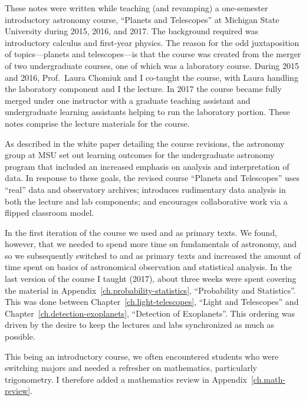 
These notes were written while teaching (and revamping) a one-semester introductory astronomy course, ``Planets and Telescopes'' at Michigan State University during 2015, 2016, and 2017. The background required was introductory calculus and first-year physics. The reason for the odd juxtaposition of topics---planets and telescopes---is that the course was created from the merger of two undergraduate courses, one of which was a laboratory course. During 2015 and 2016, Prof.\ Laura Chomiuk and I co-taught the course, with Laura handling the laboratory component and I the lecture. In 2017 the course became fully merged under one instructor with a graduate teaching assistant and undergraduate learning assistants helping to run the laboratory portion. These notes comprise the lecture materials for the course.

As described in the white paper detailing the course revisions\cite{BrownDevelopment-of-}, the astronomy group at MSU set out learning outcomes for the undergraduate astronomy program that included an increased emphasis on analysis and interpretation of data.
In response to these goals, the revised course ``Planets and Telescopes'' uses ``real'' data and observatory archives; introduces rudimentary data analysis in both the lecture and lab components; and encourages collaborative work via a flipped classroom model.

In the first iteration of the course we used  and  as primary texts. We found, however, that we needed to spend more time on fundamentals of astronomy, and so we subsequently switched to  and  as primary texts and increased the amount of time spent on basics of astronomical observation and statistical analysis. In the last version of the course I taught (2017), about three weeks were spent covering the material in Appendix~\ref{ch.probability-statistics}, ``Probability and Statistics''. This was done between Chapter~\ref{ch.light-telescopes}, ``Light and Telescopes'' and Chapter~\ref{ch.detection-exoplanets}, ``Detection of Exoplanets''.  This ordering was driven by the desire to keep the lectures and labs synchronized as much as possible.

This being an introductory course, we often encountered students who were switching majors and needed a refresher on mathematics, particularly trigonometry. I therefore added a mathematics review in Appendix~\ref{ch.math-review}.

